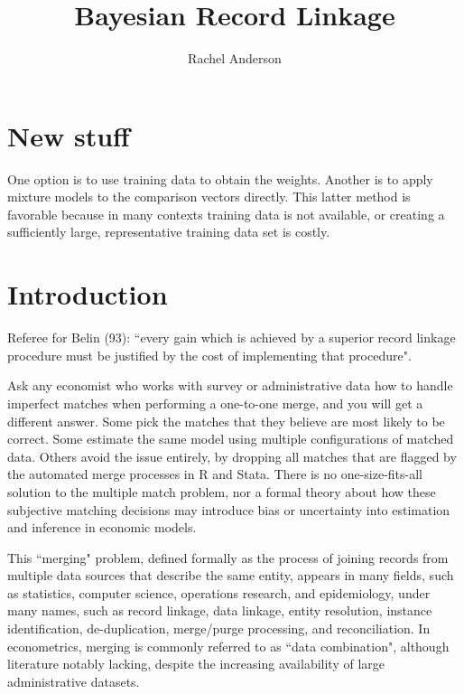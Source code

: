 \documentclass[11pt,reqno]{amsart}
\title{Bayesian Record Linkage}
\author{Rachel Anderson}
\begin{document}
\vspace*{-1cm}
\maketitle


\section{New stuff}

One option is to use training data to obtain the weights.  Another is to apply mixture models to the comparison vectors directly.  This latter method is favorable because in many contexts training data is not available, or creating a sufficiently large, representative training data set is costly.  

\section{Introduction}

Referee for Belin (93): ``every gain which is achieved by a superior record linkage procedure must be justified by the cost of implementing that procedure". 

Ask any economist who works with survey or administrative data how to handle imperfect matches when performing a one-to-one merge, and you will get a different answer.  Some pick the matches that they believe are most likely to be correct.  Some estimate the same model using multiple configurations of matched data.  Others avoid the issue entirely, by dropping all matches that are flagged by the automated merge processes in R and Stata.  There is no one-size-fits-all solution to the multiple match problem, nor a formal theory about how these subjective matching decisions may introduce bias or uncertainty into estimation and inference in economic models. 

This ``merging" problem, defined formally as the process of joining records from multiple data sources that describe the same entity, appears in many fields, such as statistics, computer science, operations research, and epidemiology, under many names, such as record linkage, data linkage, entity resolution, instance identification, de-duplication, merge/purge processing, and reconciliation.    In econometrics, merging is commonly referred to as ``data combination", although literature notably lacking, despite the increasing availability of large administrative datasets.  %
\end{document}

